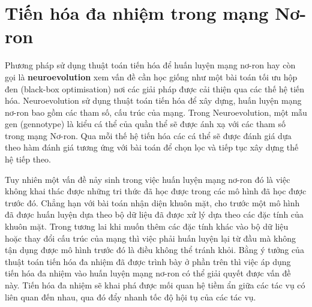 \section{Tiến hóa đa nhiệm trong mạng Nơ-ron}
    Phương pháp sử dụng thuật toán tiến hóa để huấn luyện mạng nơ-ron hay còn gọi là \textbf{neuroevolution} xem vấn đề cần học giống như một bài toán tối ưu hộp đen (black-box optimisation) nơi các giải pháp được cải thiện qua các thế hệ tiến hóa. Neuroevolution sử dụng thuật toán tiến hóa để xây dựng, huấn luyện mạng nơ-ron bao gồm các tham số, cấu trúc của mạng. Trong Neuroevolution, một mẫu gen (gennotype) là kiểu cá thể của quần thể sẽ được ánh xạ với các tham số trong mạng Nơ-ron. Qua mỗi thế hệ tiến hóa các cá thể sẽ được đánh giá dựa theo hàm đánh giá tương ứng với bài toán để chọn lọc và tiếp tục xây dựng thế hệ tiếp theo.
    
    
    Tuy nhiên một vấn đề nảy sinh trong việc huấn luyện mạng nơ-ron đó là việc không khai thác được những tri thức đã học được trong các mô hình đã học được trước đó. Chẳng hạn với bài toán nhận diện khuôn mặt, cho trước một mô hình đã được huấn luyện dựa theo bộ dữ liệu đã được xử lý dựa theo các đặc tính của khuôn mặt. Trong tương lai khi muốn thêm các đặc tính khác vào bộ dữ liệu hoặc thay đổi cấu trúc của mạng thì việc phải huấn luyện lại từ đầu mà không tận dụng được mô hình trước đó là điều không thể tránh khỏi. Bằng ý tưởng của thuật toán tiến hóa đa nhiệm đã được trình bày ở phần trên thì việc áp dụng tiến hóa đa nhiệm vào huấn luyện mạng nơ-ron có thể giải quyết được vấn đề này. Tiến hóa đa nhiệm sẽ khai phá được mối quan hệ tiềm ẩn giữa các tác vụ có liên quan đến nhau, qua đó đẩy nhanh tốc độ hội tụ của các tác vụ.
    
